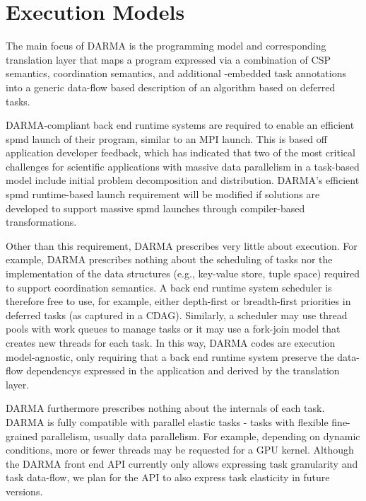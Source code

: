 

\section{Execution Models}
\label{sec:exec_model}
The main focus of \gls{DARMA} is the \gls{programming model} and corresponding
\gls{translation layer} that maps a program expressed via a combination of
\gls{CSP} semantics, \gls{coordination semantics}, and additional \CC{}-embedded task annotations into a generic data-flow based
description of an algorithm based on deferred tasks.

\gls{DARMA}-compliant \gls{back end} \gls{runtime systems} are required to enable an efficient
\gls{spmd} launch of their program, similar to an MPI launch.
This is based off application developer feedback, which has indicated that 
two of the most critical challenges for scientific applications with massive data parallelism in a task-based model
include initial problem decomposition and distribution.
\gls{DARMA}'s efficient \gls{spmd} runtime-based launch requirement 
will be modified if solutions are developed to support massive \gls{spmd} launches
through compiler-based transformations.

Other than this requirement, \gls{DARMA} prescribes very little
about execution.
For example, \gls{DARMA} prescribes nothing about the scheduling of tasks nor the implementation 
of the data structures (e.g., \gls{key-value store}, \gls{tuple space})
  required to support \gls{coordination semantics}.
A \gls{back end} \gls{runtime system} scheduler is therefore free to use, for example,
either depth-first or breadth-first priorities in deferred tasks (as captured
in a \gls{CDAG}).
Similarly, a scheduler may use \glspl{thread pool} with work queues to manage
tasks or it may use a \gls{fork-join} model that creates new threads for each task.
In this way, \gls{DARMA} codes are \gls{execution model}-agnostic, only
requiring that a \gls{back end} \gls{runtime system} preserve the
\glspl{data-flow dependency} expressed in the application and derived by the
\gls{translation layer}.

\gls{DARMA} furthermore prescribes nothing about the internals of each task.
\gls{DARMA} is fully compatible with parallel elastic tasks - tasks with flexible fine-grained parallelism, usually data parallelism.
For example, depending on dynamic conditions, more or fewer threads may be requested for a GPU kernel.
Although the \gls{DARMA} \gls{front end} \gls{API} currently only allows expressing task granularity and task data-flow,
we plan for the \gls{API} to also express task elasticity in future versions.


